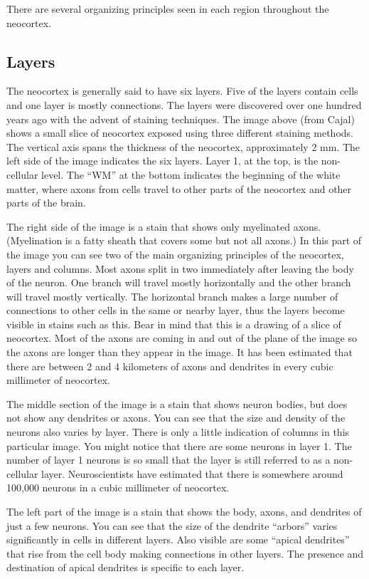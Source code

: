 \documentclass{report}
\begin{document}
There are several organizing principles seen in each region throughout
the neocortex.


\subsection*{Layers}
The neocortex is generally said to have six layers. Five of the layers
contain cells and one layer is mostly connections. The layers were
discovered over one hundred years ago with the advent of staining
techniques. The image above (from Cajal) shows a small slice of
neocortex exposed using three different staining methods. The vertical
axis spans the thickness of the neocortex, approximately 2 mm. The
left side of the image indicates the six layers. Layer 1, at the top,
is the non-cellular level. The ``WM'' at the bottom indicates the
beginning of the white matter, where axons from cells travel to other
parts of the neocortex and other parts of the brain.

The right side of the image is a stain that shows only myelinated
axons.  (Myelination is a fatty sheath that covers some but not all
axons.) In this part of the image you can see two of the main
organizing principles of the neocortex, layers and columns. Most axons
split in two immediately after leaving the body of the neuron. One
branch will travel mostly horizontally and the other branch will
travel mostly vertically. The horizontal branch makes a large number
of connections to other cells in the same or nearby layer, thus the
layers become visible in stains such as this. Bear in mind that this
is a drawing of a slice of neocortex. Most of the axons are coming in
and out of the plane of the image so the axons are longer than they
appear in the image. It has been estimated that there are between 2
and 4 kilometers of axons and dendrites in every cubic millimeter of
neocortex.

The middle section of the image is a stain that shows neuron bodies,
but does not show any dendrites or axons. You can see that the size
and density of the neurons also varies by layer. There is only a
little indication of columns in this particular image. You might
notice that there are some neurons in layer 1. The number of layer 1
neurons is so small that the layer is still referred to as a
non-cellular layer. Neuroscientists have estimated that there is
somewhere around 100,000 neurons in a cubic millimeter of neocortex.

The left part of the image is a stain that shows the body, axons, and
dendrites of just a few neurons. You can see that the size of the
dendrite ``arbors'' varies significantly in cells in different
layers. Also visible are some ``apical dendrites'' that rise from the
cell body making connections in other layers. The presence and
destination of apical dendrites is specific to each layer.
\end{document}
